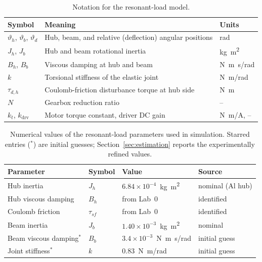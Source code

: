 \documentclass[11pt]{article}
\newcommand{\thh}{\vartheta_h}
\newcommand{\thb}{\vartheta_b}
\newcommand{\thd}{\vartheta_d}
\begin{document}
\begin{table}[H]
\centering
\caption{Notation for the resonant-load model.}
\label{tab:symbols}
\begin{tabular}{lll}
\toprule
Symbol & Meaning & Units \\
\midrule
$\thh$, $\thb$, $\thd$ & Hub, beam, and relative (deflection) angular positions & rad \\
$J_h$, $J_b$           & Hub and beam rotational inertia                         & \si{kg.m^2} \\
$B_h$, $B_b$           & Viscous damping at hub and beam                         & \si{N.m.s/rad} \\
$k$                    & Torsional stiffness of the elastic joint                 & \si{N.m/rad} \\
$\tau_{d,h}$           & Coulomb-friction disturbance torque at hub side          & \si{N.m} \\
$N$                    & Gearbox reduction ratio                                  & -- \\
$k_t$, $k_\mathrm{drv}$ & Motor torque constant, driver DC gain                  & \si{N.m/A}, -- \\
\bottomrule
\end{tabular}
\end{table}

\begin{table}[H]
\centering
\caption{Numerical values of the resonant-load parameters used in simulation.
         Starred entries (${}^*$) are initial guesses; Section~\ref{sec:estimation} reports
         the experimentally refined values.}
\label{tab:params}
\begin{tabular}{llll}
\toprule
Parameter & Symbol & Value & Source \\
\midrule
Hub inertia             & $J_h$         & $6.84\times10^{-4}$~\si{kg.m^2} & nominal (Al hub) \\
Hub viscous damping     & $B_h$         & from Lab~0                       & identified \\
Coulomb friction        & $\tau_{sf}$   & from Lab~0                       & identified \\
Beam inertia            & $J_b$         & $1.40\times10^{-3}$~\si{kg.m^2} & nominal \\
Beam viscous damping$^*$& $B_b$         & $3.4\times10^{-3}$~\si{N.m.s/rad} & initial guess \\
Joint stiffness$^*$     & $k$           & $0.83$~\si{N.m/rad}              & initial guess \\
\bottomrule
\end{tabular}
\end{table}
\end{document}
